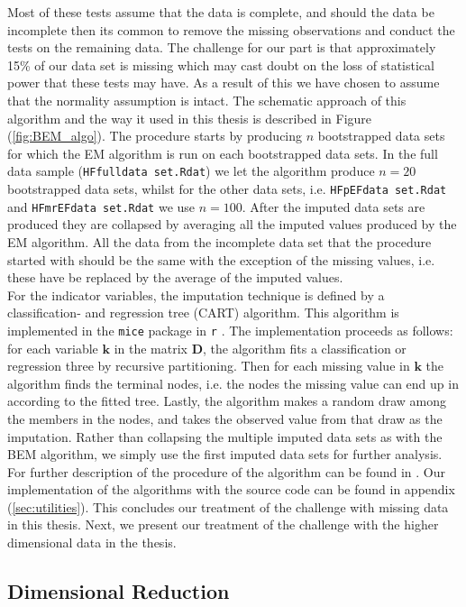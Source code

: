 \documentclass[../thesis.tex]{subfiles}
\begin{document}
Most of these tests assume that the data is complete, and should the data be incomplete then its common to remove the missing observations and conduct the tests on the remaining data. The challenge for our part is that approximately 15\% of our data set is missing which may cast doubt on the loss of statistical power that these tests may have. As a result of this we have chosen to assume that the normality assumption is intact. The schematic approach of this algorithm and the way it used in this thesis is described in Figure (\ref{fig:BEM_algo}). The procedure starts by producing $n$ bootstrapped data sets for which the EM algorithm is run on each bootstrapped data sets. In the full data sample (\texttt{HFfulldata set.Rdat}) we let the algorithm produce $n = 20$ bootstrapped data sets, whilst for the other data sets, i.e. \texttt{HFpEFdata set.Rdat} and \texttt{HFmrEFdata set.Rdat} we use $n = 100$. After the imputed data sets are produced they are collapsed by averaging all the imputed values produced by the EM algorithm. All the data from the incomplete data set that the procedure started with should be the same with the exception of the missing values, i.e. these have be replaced by the average of the imputed values.\\
\indent For the indicator variables, the imputation technique is defined by a classification- and regression tree (CART) algorithm. This algorithm is implemented in the \texttt{mice} package in \texttt{r} \citep{buuren2010mice}. The implementation proceeds as follows: for each variable $\boldsymbol{k}$ in the matrix $\boldsymbol{D}$, the algorithm fits a classification or regression three by recursive partitioning. Then for each missing value in $\boldsymbol{k}$ the algorithm finds the terminal nodes, i.e. the nodes the missing value can end up in according to the fitted tree. Lastly, the algorithm makes a random draw among the members in the nodes, and takes the observed value from that draw as the imputation. Rather than collapsing the multiple imputed data sets as with the BEM algorithm, we simply use the first imputed data sets for further analysis. For further description of the procedure of the algorithm can be found in \cite{burgette2010multiple}. Our implementation of the algorithms with the source code can be found in appendix (\ref{sec:utilities}). This concludes our treatment of the challenge with missing data in this thesis. Next, we present our treatment of the challenge with the higher dimensional data in the thesis.

\subsection{Dimensional Reduction}
\label{subsec:dim_red}
\end{document}

